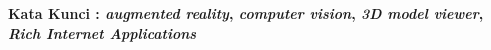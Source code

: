 \documentclass[12pt,a4paper,pdftex,final,oneside,titlepage]{book}
\begin{document}
\textbf{Kata Kunci : \textit{augmented reality}, \textit{computer vision}, \textit{3D model viewer}, \textit{Rich Internet Applications}}



\clearpage
{} 
\tableofcontents  %

\clearpage
{} 
\listoftables %

\clearpage
{} 
\listoffigures %







\nocite{*}
\renewcommand{\bibname}{Daftar Pustaka}
 



\end{document}
